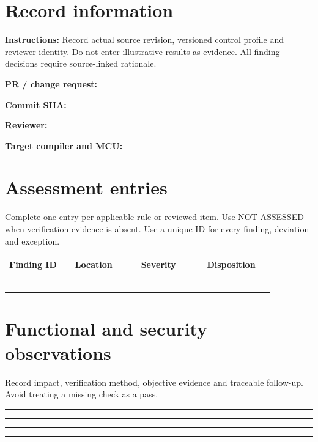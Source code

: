 \documentclass[10pt,letterpaper]{article}
\begin{document}
\makedoctitle
\makedocsummary
\section{Record information}
\textbf{Instructions:} Record actual source revision, versioned control profile and reviewer identity. Do not enter illustrative results as evidence. All finding decisions require source-linked rationale.\par\medskip
\noindent\textbf{PR / change request:}\quad\hrulefill\par\vspace{11pt}
\noindent\textbf{Commit SHA:}\quad\hrulefill\par\vspace{11pt}
\noindent\textbf{Reviewer:}\quad\hrulefill\par\vspace{11pt}
\noindent\textbf{Target compiler and MCU:}\quad\hrulefill\par\vspace{11pt}
\section{Assessment entries}
Complete one entry per applicable rule or reviewed item. Use NOT-ASSESSED when verification evidence is absent. Use a unique ID for every finding, deviation and exception.\par\medskip
\begin{longtable}{|p{0.215\linewidth}|p{0.215\linewidth}|p{0.215\linewidth}|p{0.215\linewidth}|}
\hline
\textbf{Finding ID} & \textbf{Location} & \textbf{Severity} & \textbf{Disposition}\\\hline
\endhead
\rule{0pt}{27pt} & & & \\\hline
\rule{0pt}{27pt} & & & \\\hline
\rule{0pt}{27pt} & & & \\\hline
\rule{0pt}{27pt} & & & \\\hline
\rule{0pt}{27pt} & & & \\\hline
\rule{0pt}{27pt} & & & \\\hline
\end{longtable}
\section{Functional and security observations}
Record impact, verification method, objective evidence and traceable follow-up. Avoid treating a missing check as a pass.\par\medskip
\noindent\rule{\linewidth}{0.4pt}\par\vspace{16pt}
\noindent\rule{\linewidth}{0.4pt}\par\vspace{16pt}
\noindent\rule{\linewidth}{0.4pt}\par\vspace{16pt}
\noindent\rule{\linewidth}{0.4pt}\par\vspace{16pt}
\end{document}
